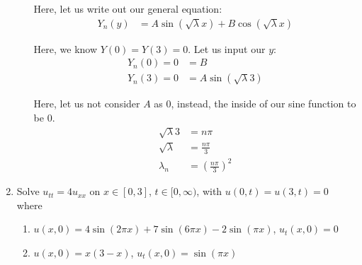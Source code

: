 \documentclass{article}
\begin{document}
\begin{enumerate}
\begin{enumerate}
    Here, let us write out our general equation:
    \begin{align}
      Y_n(y) & = A \sin ( \sqrt \lambda x) + B \cos ( \sqrt \lambda x )
    \end{align}

    Here, we know $Y(0) = Y(3) = 0$. Let us input our $y$:
    \begin{align}
      Y_n(0) = 0 & = B\\
      Y_n(3) = 0 & = A \sin( \sqrt \lambda 3 )
    \end{align}

    Here, let us not consider $A$ as $0$, instead, the inside of our sine function to be $0$.
    \begin{align}
      \sqrt \lambda 3 & = n \pi\\
      \sqrt \lambda & = \frac{n \pi}{3}\\
      \lambda_n & = \left( \frac{n \pi}{3} \right)^2
    \end{align}

  \end{enumerate}

\newpage
%
%

%
%
  \item Solve $u_{tt} = 4u_{xx}$ on $x \in [0, 3]$, $t \in [0, \infty)$, with $u(0, t) = u(3, t) = 0$ where

  \begin{enumerate}
    \item $u(x, 0) = 4 \sin(2 \pi x) + 7 \sin(6 \pi x) - 2\sin(\pi x)$, $u_t(x, 0) = 0$
    \item $u(x, 0) = x(3 - x)$, $u_t(x, 0) = \sin(\pi x)$
  \end{enumerate}
\end{enumerate}

%
%
\end{document}
